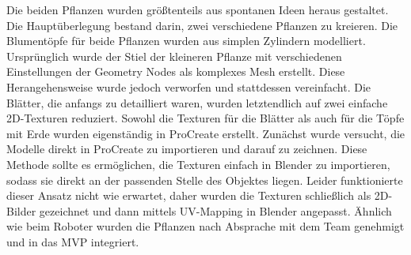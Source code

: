 Die beiden Pflanzen wurden größtenteils aus spontanen Ideen heraus gestaltet. Die Hauptüberlegung bestand darin, zwei verschiedene Pflanzen zu kreieren. Die Blumentöpfe für beide Pflanzen wurden aus simplen Zylindern modelliert. Ursprünglich wurde der Stiel der kleineren Pflanze mit verschiedenen Einstellungen der Geometry Nodes als komplexes Mesh erstellt. \cite{YouTube_2021} Diese Herangehensweise wurde jedoch verworfen und stattdessen vereinfacht. Die Blätter, die anfangs zu detailliert waren, wurden letztendlich auf zwei einfache 2D-Texturen reduziert. Sowohl die Texturen für die Blätter als auch für die Töpfe mit Erde wurden eigenständig in ProCreate erstellt. Zunächst wurde versucht, die Modelle direkt in ProCreate zu importieren und darauf zu zeichnen. Diese Methode sollte es ermöglichen, die Texturen einfach in Blender zu importieren, sodass sie direkt an der passenden Stelle des Objektes liegen. Leider funktionierte dieser Ansatz nicht wie erwartet, daher wurden die Texturen schließlich als 2D-Bilder gezeichnet und dann mittels UV-Mapping in Blender angepasst. Ähnlich wie beim Roboter wurden die Pflanzen nach Absprache mit dem Team genehmigt und in das MVP integriert.
